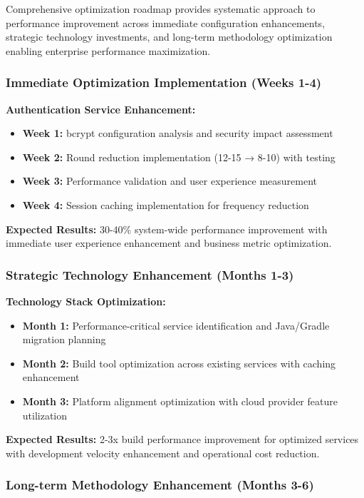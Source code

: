 Comprehensive optimization roadmap provides systematic approach to performance improvement across immediate configuration enhancements, strategic technology investments, and long-term methodology optimization enabling enterprise performance maximization.

\subsubsection{Immediate Optimization Implementation (Weeks 1-4)}

\textbf{Authentication Service Enhancement:}
\begin{itemize}
\item \textbf{Week 1:} bcrypt configuration analysis and security impact assessment
\item \textbf{Week 2:} Round reduction implementation (12-15 → 8-10) with testing
\item \textbf{Week 3:} Performance validation and user experience measurement
\item \textbf{Week 4:} Session caching implementation for frequency reduction
\end{itemize}

\textbf{Expected Results:} 30-40\% system-wide performance improvement with immediate user experience enhancement and business metric optimization.

\subsubsection{Strategic Technology Enhancement (Months 1-3)}

\textbf{Technology Stack Optimization:}
\begin{itemize}
\item \textbf{Month 1:} Performance-critical service identification and Java/Gradle migration planning
\item \textbf{Month 2:} Build tool optimization across existing services with caching enhancement
\item \textbf{Month 3:} Platform alignment optimization with cloud provider feature utilization
\end{itemize}

\textbf{Expected Results:} 2-3x build performance improvement for optimized services with development velocity enhancement and operational cost reduction.

\subsubsection{Long-term Methodology Enhancement (Months 3-6)}

